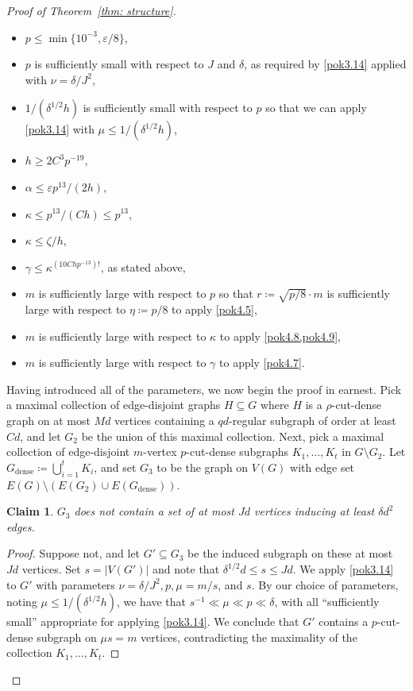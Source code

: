 \documentclass[10pt]{article}
\newtheorem{claim}[theorem]{Claim}
\theoremstyle{definition}
\let\leq\leqslant
\let\geq\geqslant
\begin{document}
\begin{proof}[Proof of Theorem~\ref{thm: structure}]
\begin{itemize}
    \item $p \leq \min\{10^{-3}, \varepsilon/8\}$,
    \item $p$ is sufficiently small with respect to $J$ and $\delta$, as required by \cref{pok3.14} applied with $\nu=\delta/J^2$,
    \item $1/(\delta^{1/2}h)$ is sufficiently small with respect to $p$ so that we can apply \cref{pok3.14} with $\mu\leq1/(\delta^{1/2}h)$,
    \item $h\geq 2 C^3 p^{-19}$,
    \item $\alpha \leq \varepsilon p^{13}/(2h)$,
    \item $\kappa \leq p^{13}/(Ch)\leq p^{13}$,
    \item $\kappa \leq \zeta/h$,
    \item $\gamma \leq \kappa^{(10Chp^{-13})!}$, as stated above,
    \item $m$ is sufficiently large with respect to $p$ so that $r\coloneqq\sqrt{p/8}\cdot m$ is sufficiently large with respect to $\eta\coloneqq p/8$ to apply \cref{pok4.5}, 
    \item $m$ is sufficiently large with respect to $\kappa$ to apply \cref{pok4.8,pok4.9},
    \item $m$ is sufficiently large with respect to $\gamma$ to apply \cref{pok4.7}.
\end{itemize}

Having introduced all of the parameters, we now begin the proof in earnest.
 Pick a maximal collection of edge-disjoint graphs $H \subseteq G$ where $H$ is a $\rho$-cut-dense graph on at most $Md$ vertices containing a $qd$-regular subgraph of order at least $Cd$, and let $G_2$ be the union of this maximal collection. Next, pick a maximal collection of edge-disjoint $m$-vertex $p$-cut-dense subgraphs $K_1, \dots, K_t$ in $G\setminus G_2$. Let $G_{\mathrm{dense}}\coloneqq\bigcup_{i=1}^t K_i$, and set $G_3$ to be the graph on $V(G)$ with edge set $E(G)\setminus (E(G_2)\cup E(G_{\mathrm{dense}}))$. 
 

\begin{claim}\label{claim:G1 good}
    $G_3$ does not contain a set of at most $Jd$ vertices inducing at least $\delta d^2$ edges.
\end{claim}
\begin{proof}
    Suppose not, and let $G'\subseteq G_3$ be the induced subgraph on these at most $Jd$ vertices. Set $s=|V(G')|$ and note that $\delta^{1/2} d\leq s\leq Jd $. We apply \cref{pok3.14} to $G'$ with parameters $\nu=\delta/J^2,p,\mu=m/s$, and $s$. By our choice of parameters, noting $\mu\leq 1/(\delta^{1/2}h)$, we have that $s^{-1}\ll \mu \ll p \ll \delta$, with all ``sufficiently small'' appropriate for applying \cref{pok3.14}. We conclude that $G'$ contains a $p$-cut-dense subgraph on $\mu s = m$ vertices, contradicting the maximality of the collection $K_1,\dots,K_t$.
\end{proof}  
 


\end{proof}
\end{document}
